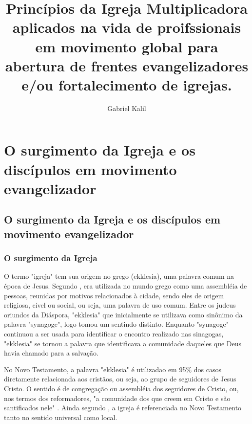 \documentclass[
	12pt,				%
	openright,			%
	twoside,			%
	a4paper,			%
	english,			%
	french,				%
	spanish,			%
	brazil				%
	]{abntex2}
\title{Princípios da Igreja Multiplicadora aplicados na vida de proifssionais em movimento global para abertura de frentes evangelizadores e/ou fortalecimento de igrejas.}
\author{Gabriel Kalil}
\date{ }
\begin{document}
  
\maketitle
  
\tableofcontents

\chapter{O surgimento da Igreja e os discípulos em movimento evangelizador}


\section{O surgimento da Igreja e os discípulos em movimento evangelizador}
 
\subsection{O surgimento da Igreja}


O termo "igreja" tem sua origem no grego (ekklesia), uma palavra comum na época de Jesus. Segundo \cite[317]{zac}, era utilizada no mundo grego como uma assembléia de pessoas, reunidas por motivos relacionados à cidade, sendo eles de origem religiosa, cível ou social, ou seja, uma palavra de uso comum. Entre os judeus oriundos da Diáspora, "ekklesia" que inicialmente se utilizava como sinônimo da palavra "synagoge", logo tomou um sentindo distinto. Enquanto "synagoge" continuou a ser usada para identificar o encontro realizado nas sinagogas, "ekklesia" se tornou a palavra que identificava a comunidade daqueles que Deus havia chamado para a salvação\cite[485]{bavinck}. 

No Novo Testamento, a palavra "ekklesia" é utilizadao em 95\% dos casos diretamente relacionada aos cristãos, ou seja, ao grupo de seguidores de Jesus Cristo. O sentido é de congregação ou assembléia dos seguidores de Cristo, ou, nos termos dos reformadores, "a comunidade dos que creem em Cristo e são santificados nele" \cite[318]{zac}. Ainda segundo \cite[318]{zac}, a igreja é referenciada no Novo Testamento tanto no sentido universal como local. 
\end{document}
